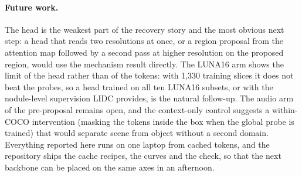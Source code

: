\documentclass[10pt,letterpaper,twocolumn]{article}
\begin{document}
\paragraph{Future work.}
The head is the weakest part of the recovery story and the most obvious next step: a head
that reads two resolutions at once, or a region proposal from the attention map followed by a
second pass at higher resolution on the proposed region, would use the mechanism result
directly. The LUNA16 arm shows the limit of the head rather than of the tokens: with 1,330
training slices it does not beat the probes, so a head trained on all ten LUNA16 subsets, or
with the nodule-level supervision LIDC provides, is the natural follow-up.
The audio arm of the pre-proposal remains open, and the context-only control suggests a
within-COCO intervention (masking the tokens inside the box when the global probe is trained)
that would separate scene from object without a second domain. Everything reported here runs
on one laptop from cached tokens, and the repository ships the cache recipes, the curves and
the check, so that the next backbone can be placed on the same axes in an afternoon.



\end{document}

